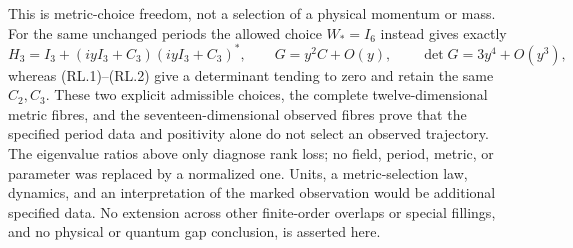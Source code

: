 This is metric-choice freedom, not a selection of a physical momentum
or mass.  For the same unchanged periods the allowed choice $W_*=I_6$
instead gives exactly
\[
 H_3=I_3+(iyI_3+C_3)(iyI_3+C_3)^*,\qquad
 G=y^2C+O(y),\qquad \det G=3y^4+O(y^3),
\]
whereas (RL.1)--(RL.2) give a determinant tending to zero and retain the
same $C_2,C_3$.  These two explicit admissible choices, the complete
twelve-dimensional metric fibres, and the seventeen-dimensional observed
fibres prove that the specified period data and positivity alone do not
select an observed trajectory.  The eigenvalue ratios above only diagnose
rank loss; no field, period, metric, or parameter was replaced by a
normalized one.  Units, a metric-selection law, dynamics, and an
interpretation of the marked observation would be additional specified
data.  No extension across other finite-order overlaps or special
fillings, and no physical or quantum gap conclusion, is asserted here.
